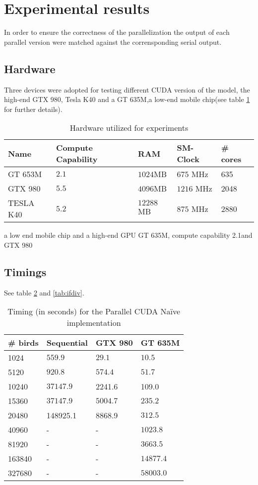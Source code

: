 \section{Experimental results}
\label{sect:experiments}
In order to ensure the correctness of the parallelization the output of each
parallel version were matched against the corrensponding serial output. 



\subsection{Hardware}
\label{sec:hardware}
Three  devices were adopted for testing different CUDA version of the
model, the high-end GTX 980, Tesla K40 and a GT 635M,a low-end mobile chip(see
table \ref{tab:adoptedHW} for further details).

 \begin{table}
	\centering
	\begin{tabular}{|l |l |l| l|l|}
	\hline
	Name & Compute Capability & RAM &
	SM-Clock & \# cores\\
	\hline
	GT 653M & \(2.1\) & \(1024\)MB  & $675$ MHz  & 635\\
	GTX 980& \(5.5\) & \(4096\)MB  & $1216$ MHz & 2048 \\
	TESLA K40& \(5.2\) & \(12288\)MB  & $875$ MHz & 2880 \\
	\hline
	\end{tabular}
	\caption{Hardware utilized for experiments}
	\label{tab:adoptedHW}
\end{table}
a low end
mobile chip and a high-end GPU GT 635M, compute capability 2.1and GTX 980

\subsection{Timings}
See table \ref{tab:naive} and \ref{tab:ifdiv}.
\begin{table}
	\centering
	\begin{tabular}{|l |l |l| l|}
	\hline
	\# birds & Sequential & GTX 980 & GT
	635M
	\\
	\hline
	
	1024  & \(559.9\) & $29.1$ & $10.5$ \\
	5120  & \(920.8\) & $574.4$ & $51.7$ \\
	10240 &  $37147.9$ & 2241.6 & 109.0 \\
	15360  & \(37147.9\) & $5004.7$ & $235.2$ \\
	20480  & 148925.1 & 8868.9 & $312.5$ \\
	40960  & - & - & $1023.8$ \\
	81920  & - & - & $3663.5$ \\
	163840  & - & - & $14877.4$ \\
	327680  & - & - & $58003.0$ \\
	\hline
	\end{tabular}
	\caption{Timing (in seconds) for the Parallel CUDA Na\"ive implementation}
	\label{tab:naive}
\end{table}


